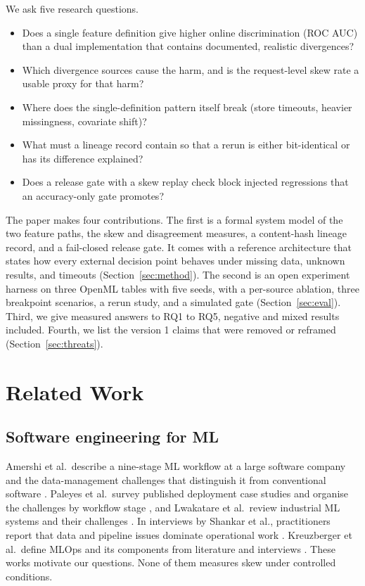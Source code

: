 \documentclass[journal]{IEEEtran}
\begin{document}
We ask five research questions.
\begin{itemize}[]
\item[RQ1:] Does a single feature definition give higher online discrimination (ROC AUC) than a dual implementation that contains documented, realistic divergences?
\item[RQ2:] Which divergence sources cause the harm, and is the request-level skew rate a usable proxy for that harm?
\item[RQ3:] Where does the single-definition pattern itself break (store timeouts, heavier missingness, covariate shift)?
\item[RQ4:] What must a lineage record contain so that a rerun is either bit-identical or has its difference explained?
\item[RQ5:] Does a release gate with a skew replay check block injected regressions that an accuracy-only gate promotes?
\end{itemize}

The paper makes four contributions. The first is a formal system model of the two feature paths, the skew and disagreement measures, a content-hash lineage record, and a fail-closed release gate. It comes with a reference architecture that states how every external decision point behaves under missing data, unknown results, and timeouts (Section~\ref{sec:method}). The second is an open experiment harness on three OpenML tables with five seeds, with a per-source ablation, three breakpoint scenarios, a rerun study, and a simulated gate (Section~\ref{sec:eval}). Third, we give measured answers to RQ1 to RQ5, negative and mixed results included. Fourth, we list the version 1 claims that were removed or reframed (Section~\ref{sec:threats}).

\section{Related Work}
\label{sec:related}

\subsection{Software engineering for ML}
Amershi et al.\ describe a nine-stage ML workflow at a large software company and the data-management challenges that distinguish it from conventional software \cite{amershi2019se4ml}. Paleyes et al.\ survey published deployment case studies and organise the challenges by workflow stage \cite{paleyes2022challenges}, and Lwakatare et al.\ review industrial ML systems and their challenges \cite{lwakatare2020largescale}. In interviews by Shankar et al., practitioners report that data and pipeline issues dominate operational work \cite{shankar2022interview}. Kreuzberger et al.\ define MLOps and its components from literature and interviews \cite{kreuzberger2023mlops}. These works motivate our questions. None of them measures skew under controlled conditions.
\end{document}
